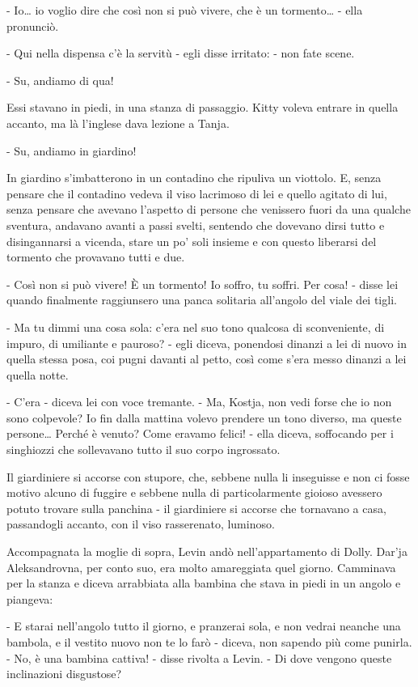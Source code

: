 - Io\ldots{} io voglio dire che così non si può vivere, che è un tormento\ldots{} - ella pronunciò. 

- Qui nella dispensa c'è la servitù - egli disse irritato: - non fate scene. 

- Su, andiamo di qua! 

Essi stavano in piedi, in una stanza di passaggio. Kitty voleva entrare in quella accanto, ma là l'inglese dava lezione a Tanja. 

- Su, andiamo in giardino! 

In giardino s'imbatterono in un contadino che ripuliva un viottolo. E, senza pensare che il contadino vedeva il viso lacrimoso di lei e quello agitato di lui, senza pensare che avevano l'aspetto di persone che venissero fuori da una qualche sventura, andavano avanti a passi svelti, sentendo che dovevano dirsi tutto e disingannarsi a vicenda, stare un po' soli insieme e con questo liberarsi del tormento che provavano tutti e due. 

- Così non si può vivere! È un tormento! Io soffro, tu soffri. Per cosa! - disse lei quando finalmente raggiunsero una panca solitaria all'angolo del viale dei tigli. 

- Ma tu dimmi una cosa sola: c'era nel suo tono qualcosa di sconveniente, di impuro, di umiliante e pauroso? - egli diceva, ponendosi dinanzi a lei di nuovo in quella stessa posa, coi pugni davanti al petto, così come s'era messo dinanzi a lei quella notte. 

- C'era - diceva lei con voce tremante. - Ma, Kostja, non vedi forse che io non sono colpevole? Io fin dalla mattina volevo prendere un tono diverso, ma queste persone\ldots{} Perché è venuto? Come eravamo felici! - ella diceva, soffocando per i singhiozzi che sollevavano tutto il suo corpo ingrossato. 

Il giardiniere si accorse con stupore, che, sebbene nulla li inseguisse e non ci fosse motivo alcuno di fuggire e sebbene nulla di particolarmente gioioso avessero potuto trovare sulla panchina - il giardiniere si accorse che tornavano a casa, passandogli accanto, con il viso rasserenato, luminoso. 

\label{xv-5} 

Accompagnata la moglie di sopra, Levin andò nell'appartamento di Dolly. Dar'ja Aleksandrovna, per conto suo, era molto amareggiata quel giorno. Camminava per la stanza e diceva arrabbiata alla bambina che stava in piedi in un angolo e piangeva: 

- E starai nell'angolo tutto il giorno, e pranzerai sola, e non vedrai neanche una bambola, e il vestito nuovo non te lo farò - diceva, non sapendo più come punirla. - No, è una bambina cattiva! - disse rivolta a Levin. - Di dove vengono queste inclinazioni disgustose? 

